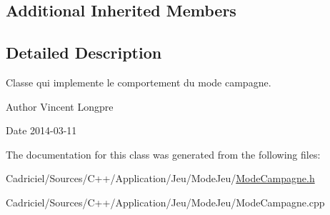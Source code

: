 \subsection*{Additional Inherited Members}


\subsection{Detailed Description}
Classe qui implemente le comportement du mode campagne. 

\begin{DoxyAuthor}{Author}
Vincent Longpre 
\end{DoxyAuthor}
\begin{DoxyDate}{Date}
2014-\/03-\/11 
\end{DoxyDate}


The documentation for this class was generated from the following files\-:\begin{DoxyCompactItemize}
\item 
Cadriciel/\-Sources/\-C++/\-Application/\-Jeu/\-Mode\-Jeu/\hyperlink{_mode_campagne_8h}{Mode\-Campagne.\-h}\item 
Cadriciel/\-Sources/\-C++/\-Application/\-Jeu/\-Mode\-Jeu/Mode\-Campagne.\-cpp\end{DoxyCompactItemize}
